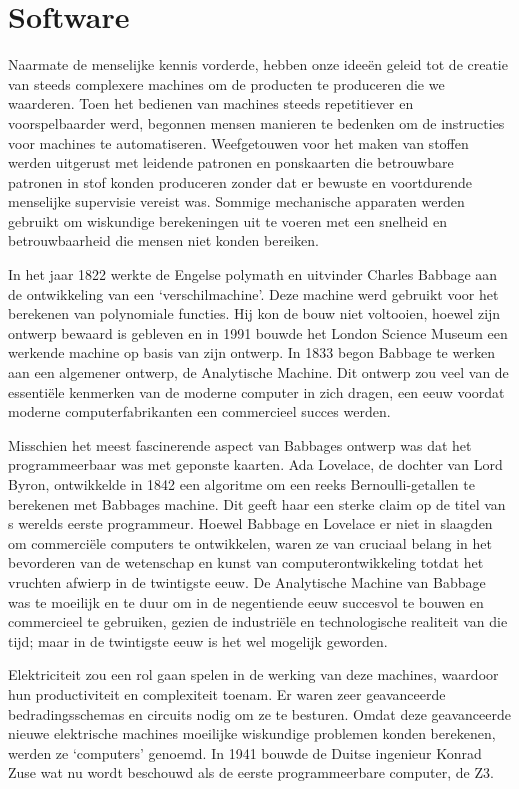 \hypertarget{software}{%
\section{Software}\label{software}}

Naarmate de menselijke kennis vorderde, hebben onze ideeën geleid tot de creatie van steeds complexere machines om de producten te produceren die we waarderen. Toen het bedienen van machines steeds repetitiever en voorspelbaarder werd, begonnen mensen manieren te bedenken om de instructies voor machines te automatiseren. Weefgetouwen voor het maken van stoffen werden uitgerust met leidende patronen en ponskaarten die betrouwbare patronen in stof konden produceren zonder dat er bewuste en voortdurende menselijke supervisie vereist was. Sommige mechanische apparaten werden gebruikt om wiskundige berekeningen uit te voeren met een snelheid en betrouwbaarheid die mensen niet konden bereiken.

In het jaar 1822 werkte de Engelse polymath en uitvinder Charles Babbage aan de ontwikkeling van een `verschilmachine'. Deze machine werd gebruikt voor het berekenen van polynomiale functies. \autocite{81} Hij kon de bouw niet voltooien, hoewel zijn ontwerp bewaard is gebleven en in 1991 bouwde het London Science Museum een werkende machine op basis van zijn ontwerp. In 1833 begon Babbage te werken aan een algemener ontwerp, de Analytische Machine. Dit ontwerp zou veel van de essentiële kenmerken van de moderne computer in zich dragen, een eeuw voordat moderne computerfabrikanten een commercieel succes werden.

Misschien het meest fascinerende aspect van Babbage\textquotesingle s ontwerp was dat het programmeerbaar was met geponste kaarten. Ada Lovelace, de dochter van Lord Byron, ontwikkelde in 1842 een algoritme om een reeks Bernoulli-getallen te berekenen met Babbage\textquotesingle s machine. Dit geeft haar een sterke claim op de titel van \textquotesingle s werelds eerste programmeur. \autocite{82} Hoewel Babbage en Lovelace er niet in slaagden om commerciële computers te ontwikkelen, waren ze van cruciaal belang in het bevorderen van de wetenschap en kunst van computerontwikkeling totdat het vruchten afwierp in de twintigste eeuw. De Analytische Machine van Babbage was te moeilijk en te duur om in de negentiende eeuw succesvol te bouwen en commercieel te gebruiken, gezien de industriële en technologische realiteit van die tijd; maar in de twintigste eeuw is het wel mogelijk geworden.

Elektriciteit zou een rol gaan spelen in de werking van deze machines, waardoor hun productiviteit en complexiteit toenam. Er waren zeer geavanceerde bedradingsschema\textquotesingle s en circuits nodig om ze te besturen. Omdat deze geavanceerde nieuwe elektrische machines moeilijke wiskundige problemen konden berekenen, werden ze `computers' genoemd. In 1941 bouwde de Duitse ingenieur Konrad Zuse wat nu wordt beschouwd als de eerste programmeerbare computer, de Z3.\autocite{83}

